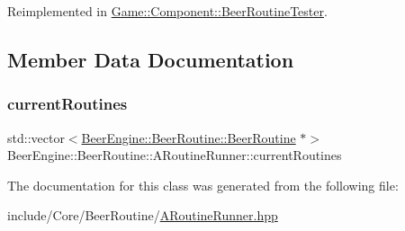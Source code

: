 Reimplemented in \mbox{\hyperlink{class_game_1_1_component_1_1_beer_routine_tester_a2f14ce6211722f92a8ec5886dbeabd6c}{Game\+::\+Component\+::\+Beer\+Routine\+Tester}}.



\subsection{Member Data Documentation}
\mbox{\label{class_beer_engine_1_1_beer_routine_1_1_a_routine_runner_a529596ac2d47cd5a2efb58f93fb40ff4}} 
\subsubsection{\texorpdfstring{current\+Routines}{currentRoutines}}
{\footnotesize\ttfamily std\+::vector$<$\mbox{\hyperlink{class_beer_engine_1_1_beer_routine_1_1_beer_routine}{Beer\+Engine\+::\+Beer\+Routine\+::\+Beer\+Routine}} $\ast$$>$ Beer\+Engine\+::\+Beer\+Routine\+::\+A\+Routine\+Runner\+::current\+Routines}



The documentation for this class was generated from the following file\+:\begin{DoxyCompactItemize}
\item 
include/\+Core/\+Beer\+Routine/\mbox{\hyperlink{_a_routine_runner_8hpp}{A\+Routine\+Runner.\+hpp}}\end{DoxyCompactItemize}
